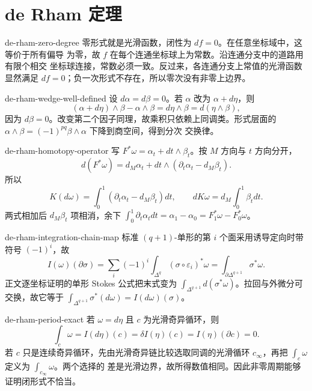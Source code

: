\chapter{de Rham 定理}

\begin{solution}{de-rham-zero-degree}
零形式就是光滑函数，闭性为 $df=0$。在任意坐标域中，这等价于所有偏导
为零，故 $f$ 在每个连通坐标球上为常数。沿连通分支中的道路用有限个相交
坐标球连接，常数必须一致。反过来，各连通分支上常值的光滑函数显然满足
$df=0$；负一次形式不存在，所以零次没有非零上边界。
\end{solution}

\begin{solution}{de-rham-wedge-well-defined}
设 $d\alpha=d\beta=0$。若 $\alpha$ 改为 $\alpha+d\eta$，则
\[
 (\alpha+d\eta)\wedge\beta-\alpha\wedge\beta
 =d\eta\wedge\beta=d(\eta\wedge\beta),
\]
因为 $d\beta=0$。改变第二个因子同理，故乘积只依赖上同调类。形式层面的
$\alpha\wedge\beta=(-1)^{pq}\beta\wedge\alpha$ 下降到商空间，得到分次
交换律。
\end{solution}

\begin{solution}{de-rham-homotopy-operator}
写 $F^*\omega=\alpha_t+dt\wedge\beta_t$。按 $M$ 方向与 $t$ 方向分开，
\[
 d(F^*\omega)=d_M\alpha_t+dt\wedge
 (\partial_t\alpha_t-d_M\beta_t).
\]
所以
\[
 K(d\omega)=\int_0^1(\partial_t\alpha_t-d_M\beta_t)dt,
 \qquad dK\omega=d_M\int_0^1\beta_tdt.
\]
两式相加后 $d_M\beta_t$ 项相消，余下
$\int_0^1\partial_t\alpha_tdt=\alpha_1-\alpha_0=F_1^*\omega-F_0^*\omega$。
\end{solution}

\begin{solution}{de-rham-integration-chain-map}
标准 $(q+1)$-单形的第 $i$ 个面采用诱导定向时带符号 $(-1)^i$，故
\[
 I(\omega)(\partial\sigma)
 =\sum_i(-1)^i\int_{\Delta^q}(\sigma\circ\varepsilon_i)^*\omega
 =\int_{\partial\Delta^{q+1}}\sigma^*\omega.
\]
正文逐坐标证明的单形 Stokes 公式把末式变为
$\int_{\Delta^{q+1}}d(\sigma^*\omega)$。拉回与外微分可交换，故它等于
$\int_{\Delta^{q+1}}\sigma^*(d\omega)=I(d\omega)(\sigma)$。
\end{solution}

\begin{solution}{de-rham-period-exact}
若 $\omega=d\eta$ 且 $c$ 为光滑奇异循环，则
\[
 \int_c\omega=I(d\eta)(c)=\delta I(\eta)(c)
 =I(\eta)(\partial c)=0.
\]
若 $c$ 只是连续奇异循环，先由光滑奇异链比较选取同调的光滑循环
$c_\infty$，再把 $\int_c\omega$ 定义为 $\int_{c_\infty}\omega$。两个选择的
差是光滑边界，故所得数值相同。因此非零周期能够证明闭形式不恰当。
\end{solution}

